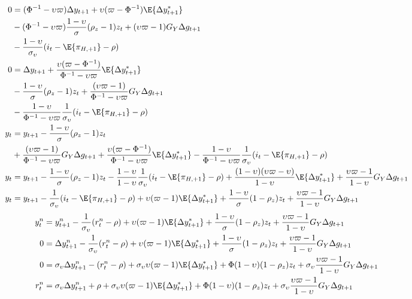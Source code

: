 \begin{align*}
    0  &= (\Phi^{-1} -\upsilon \varpi) \Delta y_{t+1} + \upsilon (\varpi - \Phi^{-1})\E \{\Delta y_{t+1}^* \} \\
        &  -(\Phi^{-1} -\upsilon \varpi)\frac{1-\upsilon}{\sigma} (\rho_z - 1)z_t + (\upsilon \varpi  - 1) G_Y \Delta g_{t+1}\\
        &- \frac{1-\upsilon}{\sigma_\upsilon}(i_t - \E \{ \pi_{H,+1}\} - \rho)\\
    0  &= \Delta y_{t+1} + \frac{\upsilon (\varpi - \Phi^{-1})}{\Phi^{-1} -\upsilon \varpi}\E \{\Delta y_{t+1}^* \} \\
        &  -\frac{1-\upsilon}{\sigma} (\rho_z - 1)z_t + \frac{(\upsilon \varpi  - 1)}{\Phi^{-1} -\upsilon \varpi} G_Y \Delta g_{t+1}\\
        &- \frac{1-\upsilon}{\Phi^{-1} -\upsilon \varpi}\frac{1}{\sigma_\upsilon}(i_t - \E \{ \pi_{H,+1}\} - \rho)\\
    y_t  &= y_{t+1}  -\frac{1-\upsilon}{\sigma} (\rho_z - 1)z_t \\
        & + \frac{(\upsilon \varpi  - 1)}{\Phi^{-1} -\upsilon \varpi} G_Y \Delta g_{t+1} + \frac{\upsilon (\varpi - \Phi^{-1})}{\Phi^{-1} -\upsilon \varpi}\E \{\Delta y_{t+1}^* \} - \frac{1-\upsilon}{\Phi^{-1} -\upsilon \varpi}\frac{1}{\sigma_\upsilon}(i_t - \E \{ \pi_{H,+1}\} - \rho) \\
    y_t  &= y_{t+1}  -\frac{1-\upsilon}{\sigma} (\rho_z - 1)z_t - \frac{1-\upsilon}{1-\upsilon}\frac{1}{\sigma_\upsilon}(i_t - \E \{ \pi_{H,+1}\} - \rho) + \frac{(1-\upsilon)(\upsilon \varpi - \upsilon)}{1 - \upsilon}\E \{\Delta y_{t+1}^* \} + \frac{\upsilon \varpi  - 1}{1-\upsilon} G_Y \Delta g_{t+1}\\
    y_t  &= y_{t+1} - \frac{1}{\sigma_\upsilon}(i_t - \E \{ \pi_{H,+1}\} - \rho) + \upsilon (\varpi - 1)\E \{\Delta y_{t+1}^* \}  + \frac{1-\upsilon}{\sigma} (1-\rho_z)z_t + \frac{\upsilon \varpi  - 1}{1-\upsilon} G_Y \Delta g_{t+1}
\end{align*}
\begin{align}
    y^n_t  &= y^n_{t+1} - \frac{1}{\sigma_\upsilon}(r^n_t - \rho) + \upsilon (\varpi - 1)\E \{\Delta y_{t+1}^* \}  + \frac{1-\upsilon}{\sigma} (1-\rho_z)z_t + \frac{\upsilon \varpi  - 1}{1-\upsilon} G_Y \Delta g_{t+1}\\
    0  &= \Delta y^n_{t+1} - \frac{1}{\sigma_\upsilon}(r^n_t - \rho) + \upsilon (\varpi - 1)\E \{\Delta y_{t+1}^* \}  + \frac{1-\upsilon}{\sigma} (1-\rho_z)z_t + \frac{\upsilon \varpi  - 1}{1-\upsilon} G_Y \Delta g_{t+1}\\
    0  &= \sigma_\upsilon \Delta y^n_{t+1} - (r^n_t - \rho) + \sigma_\upsilon \upsilon (\varpi - 1)\E \{\Delta y_{t+1}^* \}  + \Phi (1-\upsilon)(1-\rho_z)z_t + \sigma_\upsilon \frac{\upsilon \varpi  - 1}{1-\upsilon} G_Y \Delta g_{t+1}\\
    r^n_t  &= \sigma_\upsilon \Delta y^n_{t+1} + \rho + \sigma_\upsilon \upsilon (\varpi - 1)\E \{\Delta y_{t+1}^* \}  + \Phi (1-\upsilon)(1-\rho_z)z_t + \sigma_\upsilon \frac{\upsilon \varpi  - 1}{1-\upsilon} G_Y \Delta g_{t+1}\\
\end{align}
